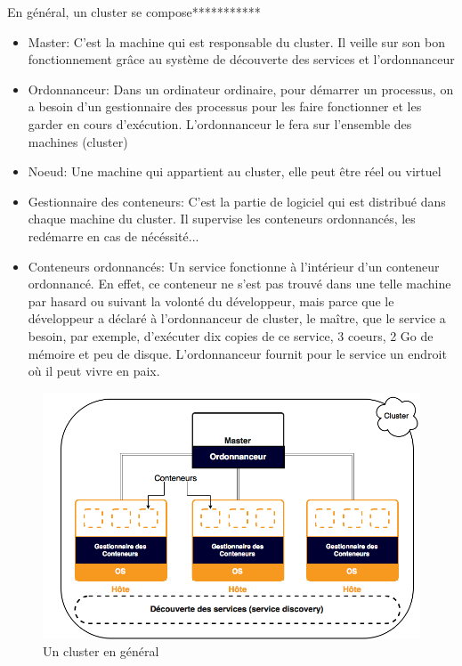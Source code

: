 \begin{onehalfspace}
En général, un cluster se compose*********** 

\begin{itemize}
	\item Master: C'est la machine qui est responsable du cluster. Il veille sur son bon fonctionnement grâce au système de découverte des services et l'ordonnanceur
	\item Ordonnanceur: Dans un ordinateur ordinaire, pour démarrer un processus, on a besoin d'un gestionnaire des processus pour les faire fonctionner et les garder en cours d'exécution. L'ordonnanceur le fera sur l'ensemble des machines (cluster)
	\item Noeud: Une machine qui appartient au cluster, elle peut être réel ou virtuel
	\item Gestionnaire des conteneurs: C'est la partie de logiciel qui est distribué dans chaque machine du cluster. Il supervise les conteneurs ordonnancés, les redémarre en cas de nécéssité...
	\item Conteneurs ordonnancés: Un service fonctionne à l'intérieur d'un conteneur ordonnancé. En effet, ce conteneur ne s'est pas trouvé dans une telle machine par hasard ou suivant la volonté du développeur, mais parce que le développeur a déclaré à l'ordonnanceur de cluster, le maître, que le service a besoin, par exemple, d'exécuter dix copies de ce service, 3 coeurs, 2 Go de mémoire et peu de disque. L'ordonnanceur fournit pour le service un endroit où il peut vivre en paix.
\end{itemize}


\begin{figure}[H]
\centering
\includegraphics [scale=0.55]{chapitre3/assets/cluster}
\caption{Un cluster en général}
\label{fig:}
\end{figure}


\end{onehalfspace}
